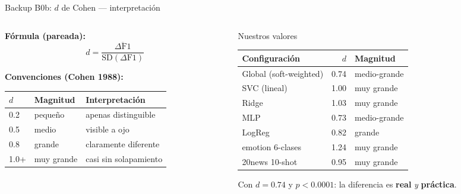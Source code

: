 \begin{frame}{Backup B0b: $d$ de Cohen — interpretación}
\small
\begin{columns}[T]

\begin{column}{0.45\textwidth}
\textbf{Fórmula (pareada):}
\[
d = \frac{\overline{\Delta\text{F1}}}{\text{SD}(\Delta\text{F1})}
\]

\vspace{0.4em}
\textbf{Convenciones (Cohen 1988):}\\[2pt]
\scriptsize
\begin{tabular}{@{}lll@{}}
\toprule
$d$ & Magnitud & Interpretación \\
\midrule
0.2 & pequeño  & apenas distinguible \\
0.5 & medio    & visible a ojo \\
0.8 & grande   & claramente diferente \\
1.0+ & muy grande & casi sin solapamiento \\
\bottomrule
\end{tabular}
\end{column}

\begin{column}{0.55\textwidth}
\begin{block}{Nuestros valores}
\scriptsize
\begin{tabular}{@{}lrl@{}}
\toprule
Configuración           & $d$    & Magnitud      \\
\midrule
Global (soft-weighted)  & 0.74   & medio-grande  \\
SVC (lineal)            & 1.00   & muy grande    \\
Ridge                   & 1.03   & muy grande    \\
MLP                     & 0.73   & medio-grande  \\
LogReg                  & 0.82   & grande        \\
\midrule
emotion 6-clases        & 1.24   & muy grande    \\
20news 10-shot          & 0.95   & muy grande    \\
\bottomrule
\end{tabular}
\end{block}

\vspace{0.3em}
\begin{insight}
\scriptsize Con $d{=}0.74$ y $p{<}0.0001$: la diferencia es \textbf{real} \emph{y} \textbf{práctica}.
\end{insight}
\end{column}

\end{columns}
\end{frame}

